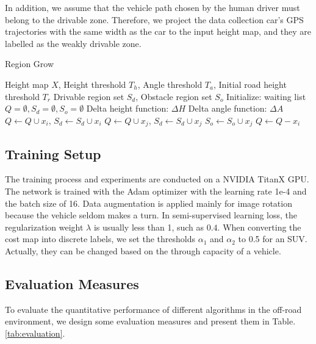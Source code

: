 \documentclass[letterpaper, 10 pt, conference]{ieeeconf}  %
\begin{document}
In addition, we assume that the vehicle path chosen by the human driver must belong to the drivable zone. Therefore, we project the data collection car's GPS trajectories with the same width as the car to the input height map, and they are labelled as the weakly drivable zone.

\begin{algorithm}	
	\caption{Region Grow}
	\label{alg:rg}
	\begin{algorithmic}[1]
		\Require Height map $X$, Height threshold $T_h$, Angle threshold $T_a$, Initial road height threshold $T_r$
		\Ensure Drivable region set $S_d$, Obstacle region set $S_o$
		\State Initialize: waiting list $Q=\emptyset,S_d=\emptyset,S_o=\emptyset$
		\State Delta height function: $\Delta H$
		\State Delta angle function: $\Delta A$
		\State $Q \gets Q \cup x_i$, $S_d \gets S_d \cup x_i$
		\EndIf
		\EndFor
		\State $Q \gets Q \cup x_j$, $S_d \gets S_d \cup x_j$
		\Else
		\State $S_o \gets S_o \cup x_j$
		\EndIf
		\EndFor
		\State $Q \gets Q-x_i$
		\EndWhile
	\end{algorithmic}
\end{algorithm}

\subsection{Training Setup}
The training process and experiments are conducted on a NVIDIA TitanX GPU. The network is trained with the Adam optimizer with the learning rate 1e-4 and the batch size of 16. Data augmentation is applied mainly for image rotation because the vehicle seldom makes a turn. In semi-supervised learning loss, the regularization weight $\lambda$ is usually less than 1, such as $0.4$. When converting the cost map into discrete labels, we set the thresholds $\alpha_1$ and $\alpha_2$ to 0.5 for an SUV. Actually, they can be changed based on the through capacity of a vehicle. 

\subsection{Evaluation Measures}	\label{sec:eval}

To evaluate the quantitative performance of different algorithms in the off-road environment, we design some evaluation measures and present them in Table.\ref{tab:evaluation}. 
\end{document}
